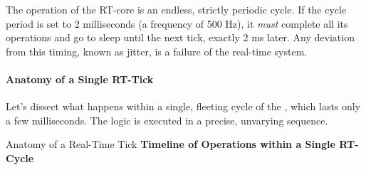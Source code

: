 The operation of the RT-core is an endless, strictly periodic cycle. If the cycle period is set to 2 milliseconds (a frequency of 500 Hz), it \textit{must} complete all its operations and go to sleep until the next tick, exactly 2 ms later. Any deviation from this timing, known as jitter, is a failure of the real-time system.

\paragraph{Anatomy of a Single RT-Tick}
Let's dissect what happens within a single, fleeting cycle of the , which lasts only a few milliseconds. The logic is executed in a precise, unvarying sequence.

    \begin{infobox}{Anatomy of a Real-Time Tick}
        \textbf{Timeline of Operations within a Single RT-Cycle}
        \vspace{0.5cm}
        

    \caption{The sequence of operations inside a single, deterministic RT-cycle. The entire sequence, from waking up to going back to sleep, must complete within the cycle's strict deadline (e.g., 2 ms).}
    \label{fig:rt_tick_anatomy}
    \end{infobox}

